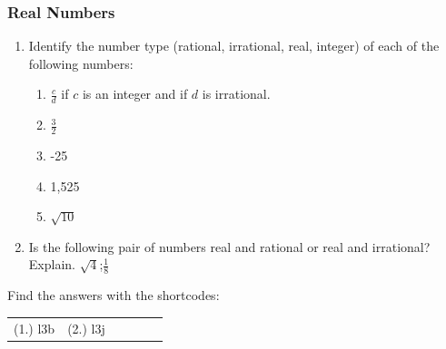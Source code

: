             \subsubsection{  Real Numbers }
            \nopagebreak
        \label{m38346*id180025}\begin{enumerate}[noitemsep, label=\textbf{\arabic*}. ] 
            \label{m38346*uid68}\item Identify the number type (rational, irrational, real, integer) of each of the following numbers:
\label{m38346*id180040}\begin{enumerate}[noitemsep, label=\textbf{\alph*}. ] 
            \label{m38346*uid69}\item $\frac{c}{d}$ if $c$ is an integer and if $d$ is irrational.
\label{m38346*uid70}\item $\frac{3}{2}$\label{m38346*uid71}\item -25
\label{m38346*uid72}\item 1,525
\label{m38346*uid73}\item $\sqrt{10}$\end{enumerate}
                \label{m38346*uid74}\item Is the following pair of numbers real and rational or real and irrational?
Explain.
$\sqrt{4}$;$\frac{1}{8}$\hspace{1ex}        \end{enumerate}
\par {} Find the answers with the shortcodes:
 \par \begin{tabular}[h]{cccccc}
 (1.) l3b  &  (2.) l3j  & \end{tabular}
